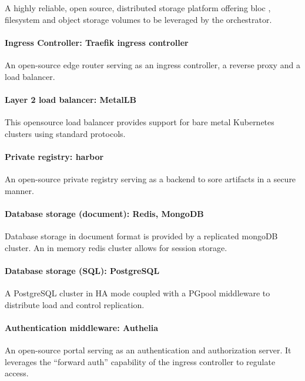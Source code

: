 A highly reliable, open source, distributed storage platform offering bloc , filesystem and object storage volumes to be leveraged by the orchestrator. 

\paragraph{Ingress Controller: Traefik ingress controller }

An open-source edge router serving as an ingress controller, a reverse proxy and a load balancer. 

\paragraph{Layer 2 load balancer: MetalLB}

This opensource load balancer provides support for bare metal Kubernetes clusters using standard protocols. 

\paragraph{Private registry: harbor }

An open-source private registry serving as a backend to sore artifacts in a secure manner. 

\paragraph{Database storage (document): Redis, MongoDB }

Database storage in document format is provided by a replicated mongoDB cluster. An in memory redis cluster allows for session storage. 

\paragraph{Database storage (SQL): PostgreSQL }

A PostgreSQL cluster in HA mode coupled with a PGpool middleware to distribute load and control replication. 

\paragraph{Authentication middleware: Authelia }

An open-source portal serving as an authentication and authorization server. It leverages the “forward auth” capability of the ingress controller to regulate access. 


